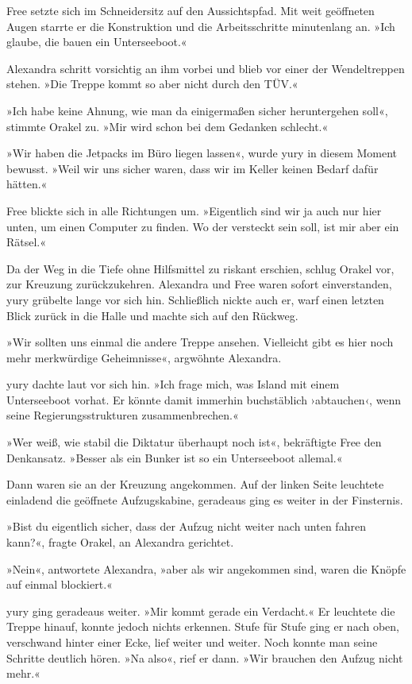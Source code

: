 Free setzte sich im Schneidersitz auf den Aussichtspfad. Mit weit geöffneten Augen starrte er die Konstruktion und die Arbeitsschritte minutenlang an. »Ich glaube, die bauen ein Unterseeboot.«

Alexandra schritt vorsichtig an ihm vorbei und blieb vor einer der Wendeltreppen stehen. »Die Treppe kommt so aber nicht durch den TÜV.«

»Ich habe keine Ahnung, wie man da einigermaßen sicher heruntergehen soll«, stimmte Orakel zu. »Mir wird schon bei dem Gedanken schlecht.«

»Wir haben die Jetpacks im Büro liegen lassen«, wurde yury in diesem Moment bewusst. »Weil wir uns sicher waren, dass wir im Keller keinen Bedarf dafür hätten.«

Free blickte sich in alle Richtungen um. »Eigentlich sind wir ja auch nur hier unten, um einen Computer zu finden. Wo der versteckt sein soll, ist mir aber ein Rätsel.«

Da der Weg in die Tiefe ohne Hilfsmittel zu riskant erschien, schlug Orakel vor, zur Kreuzung zurückzukehren. Alexandra und Free waren sofort einverstanden, yury grübelte lange vor sich hin. Schließlich nickte auch er, warf einen letzten Blick zurück in die Halle und machte sich auf den Rückweg.

»Wir sollten uns einmal die andere Treppe ansehen. Vielleicht gibt es hier noch mehr merkwürdige Geheimnisse«, argwöhnte Alexandra.

yury dachte laut vor sich hin. »Ich frage mich, was Island mit einem Unterseeboot vorhat. Er könnte damit immerhin buchstäblich ›abtauchen‹, wenn seine Regierungsstrukturen zusammenbrechen.«

»Wer weiß, wie stabil die Diktatur überhaupt noch ist«, bekräftigte Free den Denkansatz. »Besser als ein Bunker ist so ein Unterseeboot allemal.«

Dann waren sie an der Kreuzung angekommen. Auf der linken Seite leuchtete einladend die geöffnete Aufzugskabine, geradeaus ging es weiter in der Finsternis.

»Bist du eigentlich sicher, dass der Aufzug nicht weiter nach unten fahren kann?«, fragte Orakel, an Alexandra gerichtet.

»Nein«, antwortete Alexandra, »aber als wir angekommen sind, waren die Knöpfe auf einmal blockiert.«

yury ging geradeaus weiter. »Mir kommt gerade ein Verdacht.« Er leuchtete die Treppe hinauf, konnte jedoch nichts erkennen. Stufe für Stufe ging er nach oben, verschwand hinter einer Ecke, lief weiter und weiter. Noch konnte man seine Schritte deutlich hören. »Na also«, rief er dann. »Wir brauchen den Aufzug nicht mehr.«

